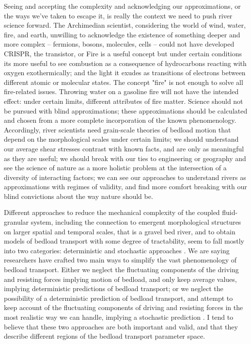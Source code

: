 \documentclass{article}
\begin{document}
Seeing and accepting the complexity and acknowledging our approximations, or the ways we've taken to escape it, is really the context we need to push river science forward. 
The Archimedian scientist, considering the world of wind, water, fire, and earth, unwilling to acknowledge the existence of something deeper and more complex -- fermions, bosons, molecules, cells -- could not have developed CRISPR, the transistor, or 
Fire is a useful concept but under certain conditions its more useful to see combustion as a consequence of hydrocarbons reacting with oxygen exothermically; and the light it exudes as transitions of electrons between different atomic or molecular states. 
The concept "fire" is not enough to solve all fire-related issues. Throwing water on a gasoline fire will not have the intended effect: under certain limits, different attributes of fire matter.  
Science should not be pursued with blind approximations; these approximations should be calculated and chosen from a more complete incorporation of the known phenomenology. 
Accordingly, river scientists need grain-scale theories of bedload motion that depend on the morphological scales under certain limits; we should understand our average shear stresses contrast with known facts, and are only as meaningful as they are useful; we should break with our ties to engineering or geography and see the science of nature as a more holistic problem at the intersection of a diversity of interacting factors; we can see our approaches to understand rivers as approximations with regimes of validity, and find more comfort breaking with our blind convictions about the way nature should be. 

Different approaches to reduce the mechanical complexity of the coupled fluid-granular system, including the connection to emergent morphological structures on larger spatial and temporal scales, that is a gravel bed river, and to obtain models of bedload transport with some degree of tractability, seem to fall mostly into two categories: deterministic and stochastic approaches \citep{Ferreira2015}. 
We are saying researchers have crafted two main ways to simplify the vast phenomenology of bedload transport. 
Either we neglect the fluctuating components of the driving and resisting forces implying motion of bedload, and only keep average values, implying deterministic predictions of bedload transport; or we neglect the possibility of a deterministic prediction of bedload transport, and attempt to keep account of the fluctuating components of driving and resisting forces in the most realistic way we can handle, implying a stochastic prediction \citep{Ferreira2015}. 
I tend to believe that these two approaches are both important and valid, and that they describe different regions of the bedload transport parameter space. 
\end{document}
